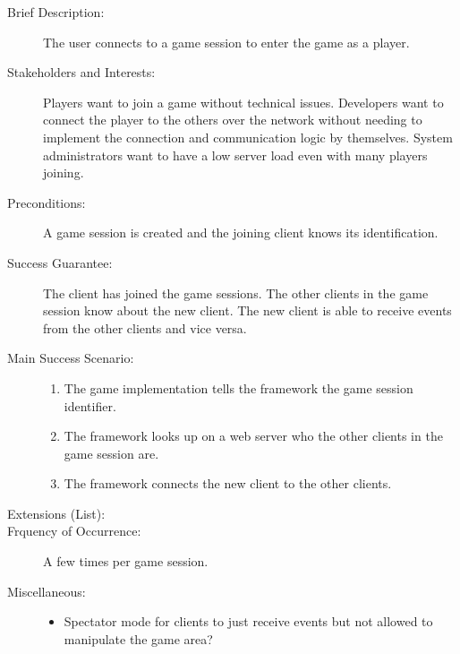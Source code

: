 \begin{description}
  \item[Brief Description:] The user connects to a game session to enter the
  game as a player.
  \item[Stakeholders and Interests:] Players want to join a game without
  technical issues. Developers want to connect the player to the others over the
  network without needing to implement the connection and communication logic by
  themselves. System administrators want to have a low server load even with
  many players joining.
  \item[Preconditions:] A game session is created and the joining client knows
  its identification.
  \item[Success Guarantee:] The client has joined the game sessions. The other
  clients in the game session know about the new client. The new client is able
  to receive events from the other clients and vice versa.
  \item[Main Success Scenario:] \hfill
  \begin{enumerate}
    \item The game implementation tells the framework the game session
    identifier.
    \item \label{itm:connectgamesession_lookup} The framework looks up on a
    web server who the other clients in the game session are.
    \item \label{itm:connectgamesession_connect} The framework connects the new
    client to the other clients.
  \end{enumerate}
  \item[Extensions (List):] \hfill
  \item[Frquency of Occurrence:] A few times per game session.
  \item[Miscellaneous:] \hfill
  \begin{itemize}
    \item Spectator mode for clients to just receive events but not allowed to
    manipulate the game area?
  \end{itemize}
\end{description}

